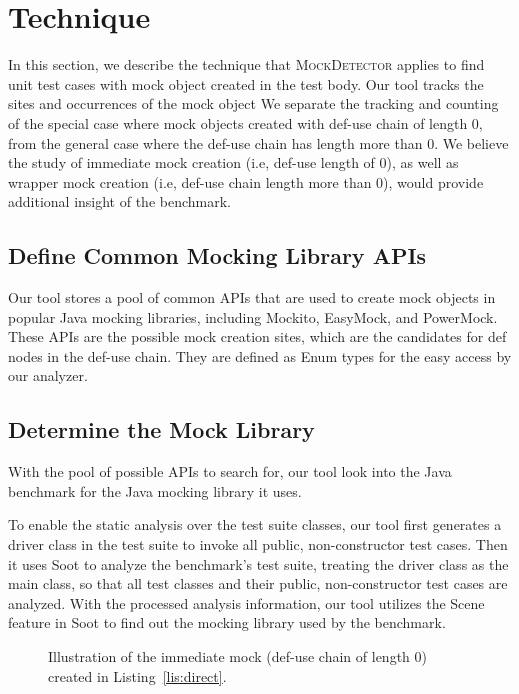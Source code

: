 \section{Technique}
\label{sec:technique}

In this section, we describe the technique that \textsc{MockDetector} applies to find unit test cases with mock object created in the test body. Our tool tracks the sites and occurrences of the mock object  We separate the tracking and counting of the special case where mock objects created with def-use chain of length 0, from the general case where the def-use chain has length more than 0. We believe the study of immediate mock creation (i.e, def-use length of 0), as well as wrapper mock creation (i.e, def-use chain length more than 0), would provide additional insight of the benchmark.

\subsection{Define Common Mocking Library APIs}
\label{subsec:collection}

Our tool stores a pool of common APIs that are used to create mock objects in popular Java mocking libraries, including Mockito, EasyMock, and PowerMock. These APIs are the possible mock creation sites, which are the candidates for def nodes in the def-use chain. They are defined as Enum types for the easy access by our analyzer. 

\subsection{Determine the Mock Library}
\label{subsec:library}

With the pool of possible APIs to search for, our tool look into the Java benchmark for the Java mocking library it uses. 

To enable the static analysis over the test suite classes, our tool first generates a driver class in the test suite to invoke all public, non-constructor test cases. Then it uses Soot to analyze the benchmark's test suite, treating the driver class as the main class, so that all test classes and their public, non-constructor test cases are analyzed. With the processed analysis information, our tool utilizes the Scene feature in Soot to find out the mocking library used by the benchmark.

\begin{figure}
	\centering
	
	\caption{Illustration of the immediate mock (def-use chain of length 0) created in Listing~\ref{lis:direct}.} 
	\label{fig:intermediate}
\end{figure}

